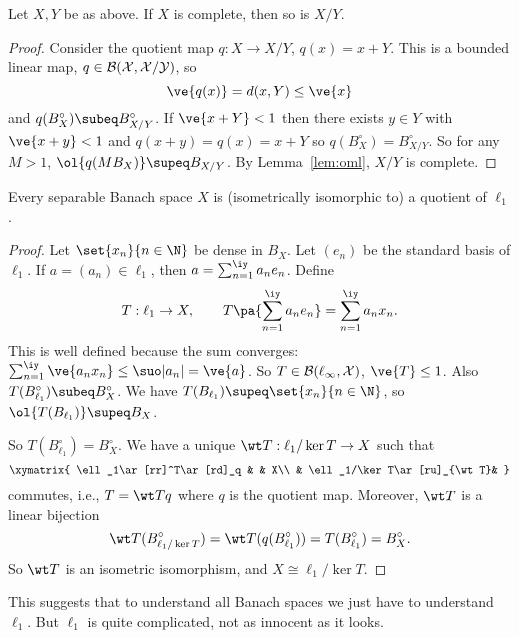 \begin{pr}%
Let $X,Y$ be as above. If $X$ is complete, then so is $X/Y$.
\end{pr}
\begin{proof}
Consider the quotient map $q:X\to X/Y$, $q(x)=x+Y$. This is a bounded linear map, $q\in \cal B(X,X/Y)$, so
\[
\ve{q(x)}=d(x,Y)\le \ve{x}
\]
and $q(B_X^{\circ})\subeq B_{X/Y}^{\circ}$. If $\ve{x+Y}<1$ then there exists $y\in Y$ with $\ve{x+y}<1$ and $q(x+y)=q(x)=x+Y$ so $q(B_X^{\circ})=B_{X/Y}^{\circ}$. So for any $M>1$, $\ol{q(MB_X)}\supeq B_{X/Y}$. %
By Lemma~\ref{lem:oml}, $X/Y$ is complete.
\end{proof}
\begin{pr}
Every separable Banach space $X$ is (isometrically isomorphic to) a quotient of $\ell_1$.
\end{pr}
\begin{proof}
Let $\set{x_n}{n\in \N}$ be dense in $B_X$. Let $(e_n)$ be the standard basis of $\ell_1$. If $a=(a_n)\in \ell_1$, then $a=\sum_{n=1}^{\iy} a_ne_n$. Define
\[
T:\ell_1\to X,\qquad T\pa{\sum_{n=1}^{\iy} a_ne_n}=\sum_{n=1}^{\iy}a_nx_n.
\]
This is well defined because the sum converges: $\sum_{n=1}^{\iy} \ve{a_nx_n}\le \suo |a_n|=\ve{a}$. So $T\in \cal B(\ell_1,X)$, $\ve{T}\le 1$. Also $T(B_{\ell_1}^{\circ})\subeq B_X^{\circ}$. 
We have $T(B_{\ell_1})\supeq \set{x_n}{n\in \N}$, so $\ol{T(B_{\ell_1})}\supeq B_X$.

So $T(B_{\ell_1}^{\circ})=B_X^{\circ}$. We have a unique $\wt T:\ell_1/\ker T\to X$ such that
\[
\xymatrix{
\ell_1\ar[rr]^T\ar[rd]_q & & X\\
& \ell_1/\ker T\ar[ru]_{\wt T}&
}
\]
commutes, i.e., $T=\wt Tq$ where $q$ is the quotient map.
Moreover, $\wt T$ is a linear bijection
\[
\wt T(B_{\ell_1/\ker T}^{\circ})=\wt T(q(B_{\ell_1}^{\circ}))=T(B_{\ell_1}^{\circ})=B_X^{\circ}.
\]
So $\wt T$ is an isometric isomorphism, and $X\cong \ell_1/\ker T$.
\end{proof}
This suggests that to understand all Banach spaces we just have to understand $\ell_1$. But $\ell_1$ is quite complicated, not as innocent as it looks.

